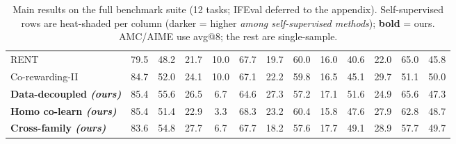 \begin{table}[t]
\begin{tabular}{lcccccccccccc}
RENT & \cellcolor{heat!6}79.5 & \cellcolor{heat!19}48.2 & \cellcolor{heat!6}21.7 & \cellcolor{heat!58}10.0 & \cellcolor{heat!49}67.7 & \cellcolor{heat!15}19.7 & \cellcolor{heat!52}60.0 & \cellcolor{heat!11}16.0 & \cellcolor{heat!12}40.6 & \cellcolor{heat!11}22.0 & \cellcolor{heat!56}65.0 & \cellcolor{heat!6}45.8 \\
Co-rewarding-II & \cellcolor{heat!51}84.7 & \cellcolor{heat!39}52.0 & \cellcolor{heat!27}24.1 & \cellcolor{heat!58}10.0 & \cellcolor{heat!41}67.1 & \cellcolor{heat!29}22.2 & \cellcolor{heat!48}59.8 & \cellcolor{heat!24}16.5 & \cellcolor{heat!31}45.1 & \cellcolor{heat!58}29.7 & \cellcolor{heat!6}51.1 & \cellcolor{heat!58}50.0 \\
\textbf{Data-decoupled \emph{(ours)}} & \cellcolor{heat!57}85.4 & \cellcolor{heat!58}55.6 & \cellcolor{heat!48}26.5 & \cellcolor{heat!32}6.7 & \cellcolor{heat!6}64.6 & \cellcolor{heat!58}27.3 & \cellcolor{heat!6}57.2 & \cellcolor{heat!40}17.1 & \cellcolor{heat!58}51.6 & \cellcolor{heat!28}24.9 & \cellcolor{heat!58}65.6 & \cellcolor{heat!25}47.3 \\
\textbf{Homo co-learn \emph{(ours)}} & \cellcolor{heat!58}85.4 & \cellcolor{heat!36}51.4 & \cellcolor{heat!16}22.9 & \cellcolor{heat!6}3.3 & \cellcolor{heat!58}68.3 & \cellcolor{heat!35}23.2 & \cellcolor{heat!58}60.4 & \cellcolor{heat!6}15.8 & \cellcolor{heat!41}47.6 & \cellcolor{heat!47}27.9 & \cellcolor{heat!48}62.8 & \cellcolor{heat!42}48.7 \\
\textbf{Cross-family \emph{(ours)}} & \cellcolor{heat!42}83.6 & \cellcolor{heat!54}54.8 & \cellcolor{heat!58}27.7 & \cellcolor{heat!32}6.7 & \cellcolor{heat!49}67.7 & \cellcolor{heat!6}18.2 & \cellcolor{heat!12}57.6 & \cellcolor{heat!58}17.7 & \cellcolor{heat!48}49.1 & \cellcolor{heat!53}28.9 & \cellcolor{heat!30}57.7 & \cellcolor{heat!55}49.7 \\
\bottomrule
\end{tabular}
\caption{Main results on the full benchmark suite (12 tasks; IFEval deferred to the appendix). Self-supervised rows are heat-shaded per column (darker = higher \emph{among self-supervised methods}); \textbf{bold} = ours. AMC/AIME use avg@8; the rest are single-sample.}
\label{tab:main}
\end{table}